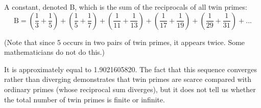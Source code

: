 A constant, denoted B, which is the sum of the reciprocals of 
all twin primes:
\[ \mathrm{B} = \left ( \frac{1}{3}+ \frac{1}{5} \right )
+  \left ( \frac{1}{5}+ \frac{1}{7} \right )
+  \left ( \frac{1}{11}+ \frac{1}{13} \right )
+  \left ( \frac{1}{17}+ \frac{1}{19} \right )
+  \left ( \frac{1}{29}+ \frac{1}{31} \right )
+  ... \]
\par
(Note that since 5 occurs in two pairs of twin primes, it appears twice. Some
mathematicians do not do this.)
\par
It is approximately equal to 1.9021605820. The fact that this sequence converges
rather than diverging demonstrates that twin primes are scarce compared with 
ordinary primes (whose reciprocal sum diverges), but it does not tell us
whether the total number of twin primes is finite or infinite.